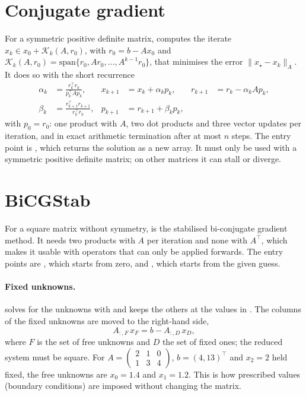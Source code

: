 \documentclass[main.tex]{subfiles}
\begin{document}
    \section{Conjugate gradient}
    For a symmetric positive definite matrix,  computes the iterate $x_k \in x_0 + \mathcal{K}_k(A,r_0)$, with $r_0=b-Ax_0$ and $\mathcal{K}_k(A,r_0)=\mathrm{span}\{r_0,Ar_0,\dots,A^{k-1}r_0\}$, that minimises the error $\lVert x_\star - x_k\rVert_A$. It does so with the short recurrence
    \begin{equation}
        \begin{aligned}
            \alpha_k &= \frac{r_k^{\top}r_k}{p_k^{\top}Ap_k}, &
            x_{k+1} &= x_k+\alpha_kp_k, &
            r_{k+1} &= r_k-\alpha_kAp_k, \\
            \beta_k &= \frac{r_{k+1}^{\top}r_{k+1}}{r_k^{\top}r_k}, &
            p_{k+1} &= r_{k+1}+\beta_kp_k , & &
        \end{aligned}
    \end{equation}
    with $p_0=r_0$: one product with $A$, two dot products and three vector updates per iteration, and in exact arithmetic termination after at most $n$ steps. The entry point is , which returns the solution as a new array. It must only be used with a symmetric positive definite matrix; on other matrices it can stall or diverge.

    \section{BiCGStab}
    For a square matrix without symmetry,  is the stabilised bi-conjugate gradient method. It needs two products with $A$ per iteration and none with $A^{\top}$, which makes it usable with operators that can only be applied forwards. The entry points are , which starts from zero, and , which starts from the given guess.

    \paragraph{Fixed unknowns.}
     solves for the unknowns with  and keeps the others at the values in . The columns of the fixed unknowns are moved to the right-hand side,
    \begin{equation}
        A_{:,F}\,x_F = b - A_{:,D}\,x_D ,
    \end{equation}
    where $F$ is the set of free unknowns and $D$ the set of fixed ones; the reduced system must be square. For $A=\begin{pmatrix}2&1&0\\1&3&4\end{pmatrix}$, $b=(4,13)^{\top}$ and $x_2=2$ held fixed, the free unknowns are $x_0=1.4$ and $x_1=1.2$. This is how prescribed values (boundary conditions) are imposed without changing the matrix.
\end{document}
